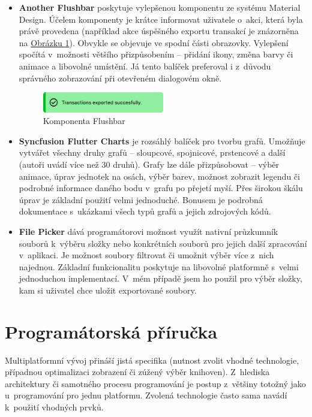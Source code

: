 \documentclass[
  biblatex,
  figures=true,
  tables=false,
  glossaries,
  index
]{kidiplom}
\begin{document}
\begin{itemize}
  \item \textbf{Another Flushbar} \cite{flushbar} poskytuje vylepšenou komponentu  ze systému Material Design. Účelem komponenty je krátce informovat uživatele o~akci, která byla právě provedena (například akce úspěšného exportu transakcí je znázorněna na \hyperref[fig:flushbar]{Obrázku \ref{fig:flushbar}}). Obvykle se objevuje ve spodní části obrazovky. Vylepšení spočítá v~možnosti většího přizpůsobením -- přidání ikony, změna barvy či animace a libovolné umístění. Já tento balíček preferoval i z~důvodu správného zobrazování při otevřeném dialogovém okně.

  \begin{figure}
    \centering
    \includegraphics[width=0.5\textwidth]{images/flushbar.pdf}
    \caption{Komponenta Flushbar}
    \label{fig:flushbar}
  \end{figure}
      
  \item \textbf{Syncfusion Flutter Charts} \cite{syncfusion-charts} je rozsáhlý balíček pro tvorbu grafů. Umožňuje vytvářet všechny druhy grafů -- sloupcové, spojnicové, prstencové a další (autoři uvádí více než 30 druhů). Grafy lze dále přizpůsobovat -- výběr animace, úprav jednotek na osách, výběr barev, možnost zobrazit legendu či podrobné informace daného bodu v~grafu po přejetí myší. Přes širokou škálu úprav je základní použití velmi jednoduché. Bonusem je podrobná dokumentace s~ukázkami všech typů grafů a jejich zdrojových kódů.
  \item \textbf{File Picker} \cite{file-picker} dává programátorovi možnost využít nativní průzkumník souborů k~výběru složky nebo konkrétních souborů pro jejich další zpracování v~aplikaci. Je možnost soubory filtrovat či umožnit výběr více z~nich najednou. Základní funkcionalitu poskytuje na libovolné platformně s~velmi jednoduchou implementací. V~mém případě jsem ho použil pro výběr složky, kam si uživatel chce uložit exportované soubory. 
\end{itemize}


\section{Programátorská příručka}

Multiplatformní vývoj přináší jistá specifika (nutnost zvolit vhodné technologie, případnou optimalizaci zobrazení či zúžený výběr knihoven). Z~hlediska architektury či samotného procesu programování je postup z~většiny totožný jako u~programování pro jednu platformu. Zvolená technologie často sama navádí k~použití vhodných prvků.
\end{document}
